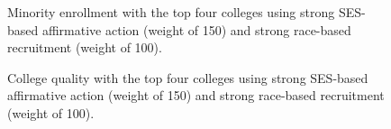 \begin{figure}[p]
  \centering
  \hfill%
  \caption{Minority enrollment with the top four colleges using strong SES-based affirmative action (weight of 150) and strong race-based recruitment (weight of 100).}
  \label{fig:c4}
\end{figure}

\begin{figure}[p]
  \centering
  \hfill%
  \caption{College quality with the top four colleges using strong SES-based affirmative action (weight of 150) and strong race-based recruitment (weight of 100).}
  \label{fig:c5}
\end{figure}

